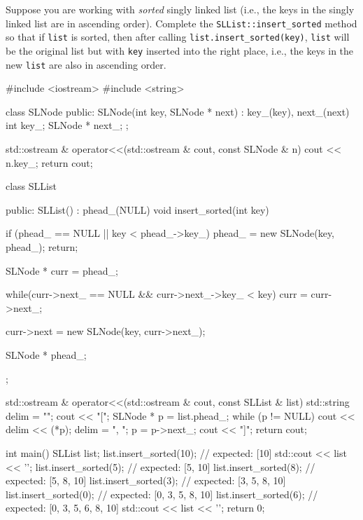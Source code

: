 

\nextq
Suppose you are working with \textit{sorted} singly linked list (i.e., the keys
in the singly linked list are in ascending order).
Complete the \verb!SLList::insert_sorted! method
so that if \verb!list! is sorted, then after calling
\verb!list.insert_sorted(key)!,
\verb!list! will be the original list but
with \verb!key! inserted into the right place, i.e., the keys
in the new \verb!list! are also in ascending order.
\\
\ANSWER
\begin{answercode}
#include <iostream>
#include <string>

class SLNode
{
public:
    SLNode(int key, SLNode * next)
    : key_(key), next_(next)
    {}
    int key_;
    SLNode * next_;
};

std::ostream & operator<<(std::ostream & cout, const SLNode & n)
{
    cout << n.key_;
    return cout;
}

class SLList
{
public:
    SLList()
        : phead_(NULL)
    {}
    void insert_sorted(int key)
    {
      if (phead_ == NULL || key < phead_->key_)
      {
        phead_ = new SLNode(key, phead_);
        return;
      }
      
      SLNode * curr = phead_;

      while(curr->next_ == NULL && curr->next_->key_ < key)
      {
        curr = curr->next_;
      }
      
      curr->next = new SLNode(key, curr->next_);
    }
    SLNode * phead_;
};

std::ostream & operator<<(std::ostream & cout, const SLList & list)
{
    std::string delim = "";
    cout << "[";
    SLNode * p = list.phead_;
    while (p != NULL)
    {
        cout << delim << (*p);
        delim = ", ";
        p = p->next_;
    }
    cout << "]";
    return cout;
}

int main()
{
    SLList list;
    list.insert_sorted(10); // expected: [10]
    std::cout << list << '\n';
    list.insert_sorted(5); // expected: [5, 10]
    list.insert_sorted(8); // expected: [5, 8, 10]
    list.insert_sorted(3); // expected: [3, 5, 8, 10]
    list.insert_sorted(0); // expected: [0, 3, 5, 8, 10]
    list.insert_sorted(6); // expected: [0, 3, 5, 6, 8, 10]
    std::cout << list << '\n';
    return 0;
}
\end{answercode}


